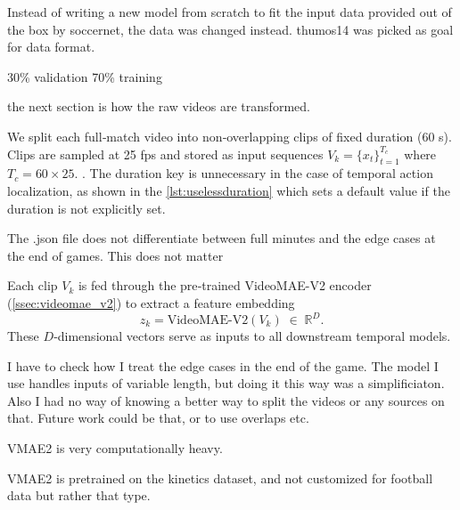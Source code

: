 Instead of writing a new model from scratch to fit the input data provided out of the box by soccernet, the data was changed instead. 
thumos14 was picked as goal for data format. 

30\% validation 70\% training


the next section is how the raw videos are transformed. 


We split each full‐match video into non‐overlapping clips of fixed duration (60 s). Clips are sampled at 25 fps and stored as input sequences $V_k=\{x_t\}_{t=1}^{T_c}$ where $T_c=60\times25$. . The duration key is unnecessary in the case of temporal action localization, as shown in the \autoref{lst:uselessduration} which sets a default value if the duration is not explicitly set. 



The .json file does not differentiate between full minutes and the edge cases at the end of games. This does not matter

Each clip $V_k$ is fed through the pre‐trained VideoMAE-V2 encoder (\autoref{ssec:videomae_v2}) to extract a feature embedding
\[
z_k = \mathrm{VideoMAE\text{-}V2}(V_k)\;\in\;\mathbb{R}^D.
\]
These $D$‐dimensional vectors serve as inputs to all downstream temporal models.

I have to check how I treat the edge cases in the end of the game. The model I use handles inputs of variable length, but doing it this way was a simplificiaton. Also I had no way of knowing a better way to split the videos or any sources on that. 
Future work could be that, or to use overlaps etc. 

VMAE2 is very computationally heavy.

VMAE2 is pretrained on the kinetics dataset, and not customized for football data but rather that type. 

